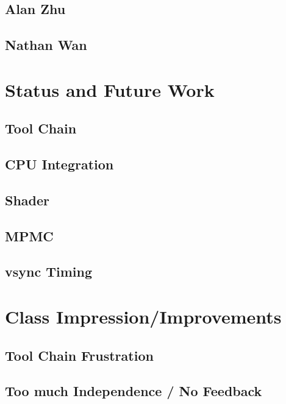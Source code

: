 \documentclass[letterpaper,10pt]{article}
\begin{document}
\subsection{Alan Zhu}
\subsection{Nathan Wan}

\section{Status and Future Work}
\subsection{Tool Chain}
\subsection{CPU Integration}
\subsection{Shader}
\subsection{MPMC}
\subsection{vsync Timing}

\section{Class Impression/Improvements}

\subsection{Tool Chain Frustration}
\subsection{Too much Independence / No Feedback}
\end{document}
